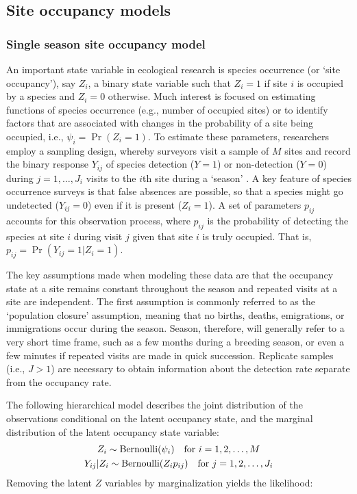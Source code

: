 \documentclass[article,shortnames]{jss}
\DeclareMathOperator{\Bern}{Bernoulli}
\begin{document}
\subsection{Site occupancy models}

\subsubsection{Single season site occupancy model} 
\label{sec:occ}
 
An important state variable in ecological research is species occurrence 
(or `site occupancy'), say $Z_{i}$, a binary state variable such that 
$Z_{i}=1$ if site $i$ is occupied by a species and $Z_{i}=0$ otherwise.
Much interest is focused on estimating functions of species occurrence 
(e.g., number of occupied sites) or to identify factors that are
associated with changes in the probability of a site being
occupied, i.e., $\psi_{i}  = \Pr(Z_{i}=1)$. To estimate these parameters, 
researchers employ a sampling design, whereby surveyors visit a sample of $M$
sites and record the binary response $Y_{ij}$ of species detection ($Y=1$) or
non-detection ($Y=0$) during $j=1,\ldots,J_{i}$ visits to the $i$th site 
during a `season' \citep{MacKenzie2002}.  
A key feature of species occurrence surveys is that false absences are 
possible, so that a species might go undetected ($Y_{ij} =0$) even if it is 
present ($Z_{i} = 1$). A set of parameters $p_{ij}$ accounts for this 
observation process, where $p_{ij}$ is the
probability of detecting the species at site $i$ during visit $j$
given that site $i$ is truly occupied.  That is, 
$p_{ij} = \Pr(Y_{ij} = 1|Z_{i} = 1)$.

The key assumptions made when modeling these data are that the occupancy 
state at a site remains constant throughout the season and repeated visits at
a site are independent.  The first assumption is commonly referred to as the
`population closure' assumption, meaning that no births, deaths, emigrations,
or immigrations occur during the season.  
Season, therefore, will generally refer to a very short time frame, such as 
a few months during a breeding season, or even a few minutes if repeated 
visits are made in quick succession.  Replicate samples (i.e., $J>1$) are 
necessary to obtain information about the detection rate separate from 
the occupancy rate.  

The following hierarchical model describes the joint distribution of the 
observations conditional on the latent occupancy state, and the marginal 
distribution of the latent occupancy state variable:
\begin{gather}
Z_i \sim \Bern(\psi_i) \text{\quad for $i=1,2,\dots,M$} \notag \\
Y_{ij}|Z_i \sim \Bern(Z_i p_{ij})\text{\quad for $j=1,2,\dots,J_{i}$} \notag
\end{gather}
Removing the latent $Z$ variables by marginalization yields the likelihood:
\end{document}

